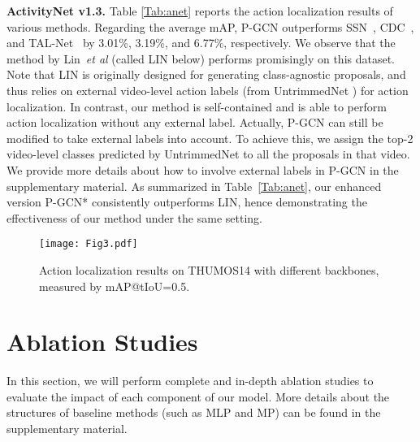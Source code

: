 \documentclass[10pt,twocolumn,letterpaper]{article}
\def\etal{\emph{et al}\onedot}
\begin{document}
	
	\noindent \textbf{ActivityNet v1.3.} Table \ref{Tab:anet} reports the action localization results of various methods. Regarding the average mAP, P-GCN outperforms SSN~\cite{zhao2017temporal}, CDC~\cite{shou2017cdc}, and TAL-Net~\cite{chao2018rethinking} by 3.01\%, 3.19\%, and 6.77\%, respectively. 
	We observe that the method by Lin~\etal \cite{lin2018bsn} (called LIN below) performs promisingly on this dataset. Note that LIN is originally designed for generating class-agnostic proposals, and thus relies on external video-level action labels (from UntrimmedNet \cite{wang2017untrimmed}) for action localization. 
	In contrast, our method is self-contained and is able to perform action localization without any external label. 
	Actually, P-GCN can still be modified to take external labels into account. 
	To achieve this, we assign the top-2 video-level classes predicted by UntrimmedNet to all the proposals in that video.
We provide more details about how to involve external labels in P-GCN in the supplementary material. As summarized in Table~\ref{Tab:anet},  our enhanced version P-GCN* consistently outperforms LIN, hence demonstrating the effectiveness of our method under the same setting.


	\begin{figure}[!tb]
		\centering
		\texttt{[image: Fig3.pdf]}
\caption{Action localization results on THUMOS14 with different backbones, measured by mAP@tIoU=0.5.}
		\vspace{-0.3cm}
		\label{Fig:instantiations}
	\end{figure}
	
	
	\section{Ablation Studies}
	In this section, we will perform complete and in-depth ablation studies to evaluate the impact of each component of our model. More details about the structures of baseline methods (such as MLP and MP) can be found in the supplementary material.
	\label{Sec:ablation}
\end{document}
